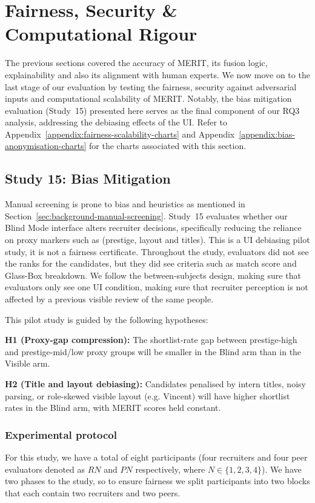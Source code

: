 \section{Fairness, Security \& Computational Rigour}
\label{sec:fairness-computational-rigour}

The previous sections covered the accuracy of MERIT, its fusion logic, explainability and also its alignment with human experts.
We now move on to the last stage of our evaluation by testing the fairness, security against adversarial inputs and computational 
scalability of MERIT. Notably, the bias mitigation evaluation (Study~15) presented here serves as the final component of our RQ3 analysis, addressing the debiasing effects of the UI. Refer to Appendix~\ref{appendix:fairness-scalability-charts} 
and Appendix~\ref{appendix:bias-anonymisation-charts} 
for the charts associated with this section.

\subsection{Study 15: Bias Mitigation}
\label{subsec:bias-mitigation-efficacy}


Manual screening is prone to bias and heuristics as mentioned in Section~\ref{sec:background-manual-screening}.
Study~15 evaluates whether our Blind Mode interface alters recruiter decisions, specifically reducing the reliance on proxy markers such
as (prestige, layout and titles). This is a UI debiasing pilot study, it is not a fairness certificate.
Throughout the study, evaluators did not see the ranks for the candidates, but they did see criteria such as match score and 
Glass-Box breakdown. We follow the between-subjects design, making sure that evaluators only see one UI condition, making sure that
recruiter perception is not affected by a previous visible review of the same people.

This pilot study is guided by the following hypotheses:

\textbf{H1 (Proxy-gap compression):} The shortlist-rate gap between prestige-high and prestige-mid/low proxy groups will be smaller in the Blind arm than in the Visible arm.

\textbf{H2 (Title and layout debiasing):} Candidates penalised by intern titles, noisy parsing, or role-skewed visible layout (e.g. Vincent) will have higher shortlist rates in the Blind arm, with MERIT scores held constant.


\subsubsection{Experimental protocol}
For this study, we have a total of eight participants (four recruiters and four peer evaluators denoted as $RN$ and $PN$ respectively, where $N \in \{1, 2, 3, 4\}$).
We have two phases to the study, so to ensure fairness we split participants into two blocks that each contain two recruiters and two peers.

